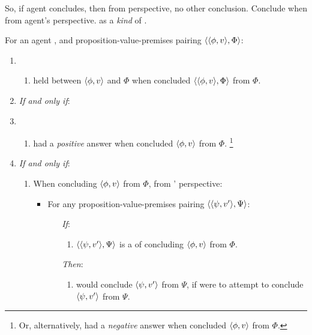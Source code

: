 \begin{note}
  So, if agent concludes, then from perspective, no other conclusion.
  Conclude when \support{} from agent's perspective.
  \zSN{} as a \emph{kind} of \support{}.

  \begin{definition}[\zS{}]
    \label{idea:zS}
    For an agent \vAgent{}, and proposition-value-premises pairing \(\langle \langle \phi, v \rangle, \Phi \rangle\):
    \begin{enumerate}[label=]
    \item
      \begin{enumerate}[label=]
      \item
        \zS{} held between \(\langle \phi, v \rangle\) and \(\Phi\) when \vAgent{} concluded \(\langle \langle \phi, v \rangle, \Phi \rangle\) from \(\Phi\).
      \end{enumerate}
    \item \emph{If and only if}:
    \item
      \begin{enumerate}[label=]
      \item
        \qzS{} had a \emph{positive} answer when \vAgent{} concluded \(\langle \phi, v \rangle\) from \(\Phi\).%
        \footnote{
          Or, alternatively, \nqzS{} had a \emph{negative} answer when \vAgent{} concluded \(\langle \phi, v \rangle\) from \(\Phi\).
        }
      \end{enumerate}
    \item \emph{If and only if}:
      \begin{enumerate}[label=]
      \item
        When concluding \(\langle \phi, v \rangle\) from \(\Phi\), from \vAgent{}' perspective:
        \begin{itemize}
        \item
          For any proposition-value-premises pairing \(\langle \langle \psi, v' \rangle, \Psi \rangle\):
          \begin{itemize}
          \item[\emph{If}:]
            \begin{enumerate}[label=\alph*., ref=(\alph*)]
            \item
              \(\langle \langle \psi, v' \rangle, \Psi \rangle\) is a \requ{} of concluding \(\langle \phi, v \rangle\) from \(\Phi\).
            \end{enumerate}
          \item[\emph{Then}:]
            \begin{enumerate}[label=\alph*., ref=(\alph*), resume]
            \item
              \vAgent{} would conclude \(\langle \psi, v' \rangle\) from \(\Psi\), if \vAgent{} were to attempt to conclude \(\langle \psi, v' \rangle\) from \(\Psi\).
            \end{enumerate}
          \end{itemize}
        \end{itemize}
      \end{enumerate}
    \end{enumerate}
    \vspace{-\baselineskip}
  \end{definition}


\end{note}
